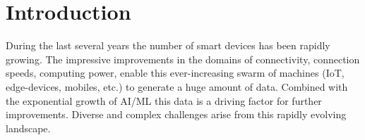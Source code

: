 \chapter{Introduction}\label{chapter:Introduction}


During the last several years the number of smart devices has been rapidly growing.
The impressive improvements in the domains of connectivity, connection speeds, computing power,
enable this ever-increasing swarm of machines (IoT, edge-devices, mobiles, etc.) to generate a huge amount of data.
Combined with the exponential growth of AI/ML this data is a driving factor for further improvements.
Diverse and complex challenges arise from this rapidly evolving landscape.




